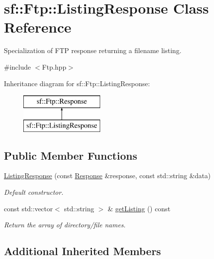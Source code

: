 \hypertarget{classsf_1_1_ftp_1_1_listing_response}{}\section{sf\+:\+:Ftp\+:\+:Listing\+Response Class Reference}
\label{classsf_1_1_ftp_1_1_listing_response}


Specialization of F\+TP response returning a filename listing.  




{\ttfamily \#include $<$Ftp.\+hpp$>$}

Inheritance diagram for sf\+:\+:Ftp\+:\+:Listing\+Response\+:\begin{figure}[H]
\begin{center}
\leavevmode
\includegraphics[height=2.000000cm]{classsf_1_1_ftp_1_1_listing_response}
\end{center}
\end{figure}
\subsection*{Public Member Functions}
\begin{DoxyCompactItemize}
\item 
\hyperlink{classsf_1_1_ftp_1_1_listing_response_a7e98d0aed70105c71adb52e5b6ce0bb8}{Listing\+Response} (const \hyperlink{classsf_1_1_ftp_1_1_response}{Response} \&response, const std\+::string \&data)
\begin{DoxyCompactList}\small\item\em Default constructor. \end{DoxyCompactList}\item 
const std\+::vector$<$ std\+::string $>$ \& \hyperlink{classsf_1_1_ftp_1_1_listing_response_a6cdcdfcc6a9008c7e1eddb48b164793d}{get\+Listing} () const
\begin{DoxyCompactList}\small\item\em Return the array of directory/file names. \end{DoxyCompactList}\end{DoxyCompactItemize}
\subsection*{Additional Inherited Members}


